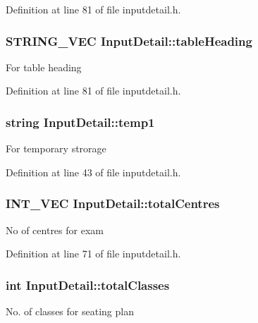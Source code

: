Definition at line 81 of file inputdetail.\-h.

\hypertarget{classInputDetail_a9adc25a6c332855ee0c2dbd5fd71ca86}{
\subsubsection[{table\-Heading}]{\setlength{\rightskip}{0pt plus 5cm}S\-T\-R\-I\-N\-G\-\_\-\-V\-E\-C Input\-Detail\-::table\-Heading\hspace{0.3cm}{\ttfamily [protected]}}}\label{classInputDetail_a9adc25a6c332855ee0c2dbd5fd71ca86}
For table heading 

Definition at line 81 of file inputdetail.\-h.

\hypertarget{classInputDetail_aa5659e496977cc83f743725f6aaf2d6a}{
\subsubsection[{temp1}]{\setlength{\rightskip}{0pt plus 5cm}string Input\-Detail\-::temp1\hspace{0.3cm}{\ttfamily [protected]}}}\label{classInputDetail_aa5659e496977cc83f743725f6aaf2d6a}
For temporary strorage 

Definition at line 43 of file inputdetail.\-h.

\hypertarget{classInputDetail_a11f9eb0c33682bf3c9b1e2cac50ebaad}{
\subsubsection[{total\-Centres}]{\setlength{\rightskip}{0pt plus 5cm}I\-N\-T\-\_\-\-V\-E\-C Input\-Detail\-::total\-Centres\hspace{0.3cm}{\ttfamily [protected]}}}\label{classInputDetail_a11f9eb0c33682bf3c9b1e2cac50ebaad}
No of centres for exam 

Definition at line 71 of file inputdetail.\-h.

\hypertarget{classInputDetail_aac4c49f5453d86c4c79bcb87361ad28d}{
\subsubsection[{total\-Classes}]{\setlength{\rightskip}{0pt plus 5cm}int Input\-Detail\-::total\-Classes\hspace{0.3cm}{\ttfamily [protected]}}}\label{classInputDetail_aac4c49f5453d86c4c79bcb87361ad28d}
No. of classes for seating plan 

